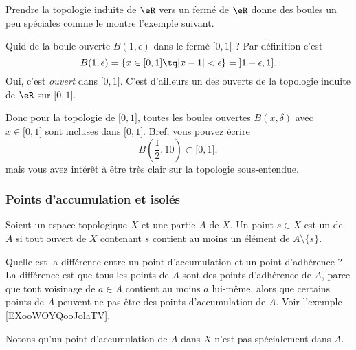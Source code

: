 Prendre la topologie induite de \( \eR\) vers un fermé de \( \eR\) donne des boules un peu spéciales comme le montre l'exemple suivant.

\begin{example}  \label{ExKYZwYxn}
	Quid de la boule ouverte \( B(1,\epsilon)\) dans le fermé \( \mathopen[ 0 , 1 \mathclose]\) ? Par définition c'est
	\begin{equation}
		B(1,\epsilon)=\{ x\in\mathopen[ 0 , 1 \mathclose]\tq | x-1 |<\epsilon \}=\mathopen] 1-\epsilon , 1 \mathclose].
	\end{equation}
	Oui, c'est \emph{ouvert} dans \( \mathopen[ 0 , 1 \mathclose]\). C'est d'ailleurs un des ouverts de la topologie induite de \( \eR\) sur \( \mathopen[ 0 , 1 \mathclose]\).

	Donc pour la topologie de \( \mathopen[ 0 , 1 \mathclose]\), toutes les boules ouvertes \( B(x,\delta)\) avec \( x\in\mathopen[ 0 , 1 \mathclose]\) sont incluses dans \( \mathopen[ 0 , 1 \mathclose]\). Bref, vous pouvez écrire
	\begin{equation}
		B(\frac{ 1 }{2}, 10)\subset \mathopen[ 0 , 1 \mathclose],
	\end{equation}
	mais vous avez intérêt à être très clair sur la topologie sous-entendue.
\end{example}


\subsubsection{Points d'accumulation et isolés}

\begin{definition}      \label{DEFooGHUUooZKTJRi}
	Soient un espace topologique \( X\) et une partie \( A\) de \( X\). Un point \( s\in X \) est un  de \( A\) si tout ouvert de \( X\) contenant \( s\) contient au moins un élément de \( A\setminus\{ s \}\).
\end{definition}

Quelle est la différence entre un point d'accumulation et un point d'adhérence ? La différence est que tous les points de \( A\) sont des points d'adhérence de \( A\), parce que tout voisinage de \( a\in A\) contient au moins \( a\) lui-même, alors que certains points de \( A\) peuvent ne pas être des points d'accumulation de \( A\). Voir l'exemple \ref{EXooWOYQooJolaTV}.

Notons qu'un point d'accumulation de \( A\) dans \( X\) n'est pas spécialement dans \( A\).

